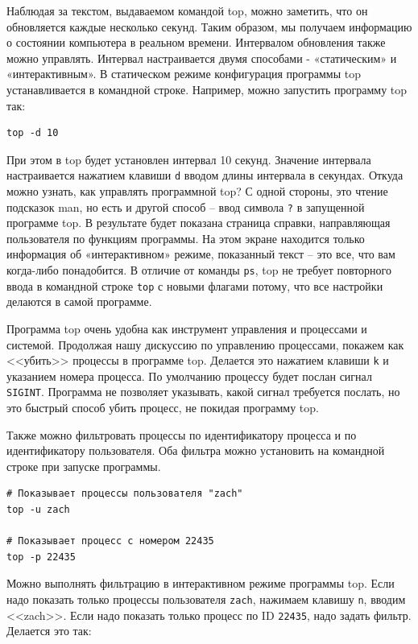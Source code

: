 \documentclass[12pt]{article}
\begin{document}
Наблюдая за текстом, выдаваемом командой top, можно заметить, что он
обновляется каждые несколько секунд. Таким образом, мы получаем информацию
о состоянии компьютера в реальном времени. Интервалом обновления также
можно управлять. Интервал настраивается двумя способами - «статическим»
и «интерактивным». В статическом режиме конфигурация программы top
устанавливается в командной строке. Например, можно запустить программу
top так:

\begin{verbatim}
top -d 10
\end{verbatim}

При этом в top будет установлен интервал 10 секунд. Значение интервала
настраивается нажатием клавиши \texttt{d} вводом длины интервала в
секундах. Откуда можно узнать, как управлять программной top? С одной
стороны, это чтение подсказок man, но есть и другой способ -- ввод
символа \texttt{?} в запущенной программе top. В результате будет
показана страница справки, направляющая пользователя по функциям
программы. На этом экране находится только информация об «интерактивном»
режиме, показанный текст -- это все, что вам когда-либо понадобится. В
отличие от команды \texttt{ps}, top не требует повторного ввода в
командной строке \texttt{top} с новыми флагами потому, что все настройки
делаются в самой программе.

Программа top очень удобна как инструмент управления и процессами и
системой. Продолжая нашу дискуссию по управлению процессами, покажем как
<<убить>> процессы в программе top. Делается это нажатием клавиши
\texttt{k} и указанием номера процесса. По умолчанию процессу будет
послан сигнал \texttt{SIGINT}. Программа не позволяет указывать, какой
сигнал требуется послать, но это быстрый способ убить процесс, не
покидая программу top.

Также можно фильтровать процессы по идентификатору процесса и по
идентификатору пользователя. Оба фильтра можно установить на командной
строке при запуске программы.

\begin{verbatim}
# Показывает процессы пользователя "zach"
top -u zach

# Показывает процесс с номером 22435
top -p 22435
\end{verbatim}

Можно выполнять фильтрацию в интерактивном режиме программы top. Если
надо показать только процессы пользователя \texttt{zach}, нажимаем
клавишу \texttt{n}, вводим <<zach>>. Если надо показать только процесс по
ID \texttt{22435}, надо задать фильтр. Делается это так:
\end{document}
